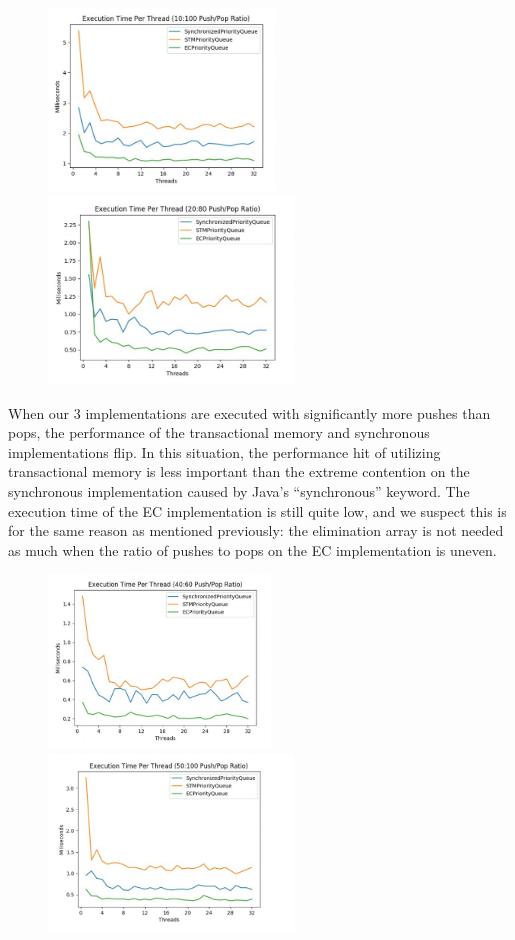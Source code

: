 \documentclass[10pt]{asme2ej}
\begin{document}
\begin{figure}[htp]
\centering
\includegraphics[width=6cm]{1.jpg}
\includegraphics[width=6.5cm]{2.jpg}
\end{figure}

When our 3 implementations are executed with significantly more pushes than pops, the performance
of the transactional memory and synchronous implementations flip. In this situation, the performance
hit of utilizing transactional memory is less important than the extreme contention on the synchronous implementation caused by Java’s “synchronous” keyword. The execution time of the EC
implementation is still quite low, and we suspect this is for the same reason as mentioned previously: the elimination array is not needed as much when the ratio of pushes to pops on the EC implementation is uneven.

\begin{figure}[htp]
\centering
\includegraphics[width=5.9cm]{3.jpg}
\includegraphics[width=6.5cm]{4.jpg}
\end{figure}
\end{document}
